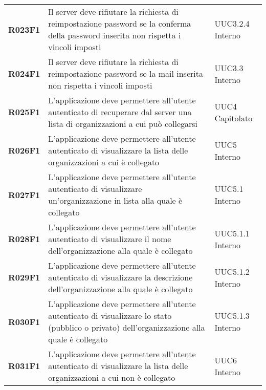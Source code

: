 \documentclass[../analisi-dei-requisiti.tex]{subfiles}
\begin{document}
\begin{longtable}[H]{>{\centering\bfseries}m{3cm} >{\centering}m{10cm} >{\centering\arraybackslash}m{3cm}}
  R023F1                               & Il server deve rifiutare la richiesta di reimpostazione password se la conferma della password inserita non rispetta i vincoli imposti                                                                  & UUC3.2.4 Interno              \\
  R024F1                               & Il server deve rifiutare la richiesta di reimpostazione password se la mail inserita non rispetta i vincoli imposti                                                                                     & UUC3.3 Interno                \\

  R025F1                               & L'applicazione deve permettere all'utente autenticato di recuperare dal server una lista di organizzazioni a cui può collegarsi                                                                         & UUC4 Capitolato               \\
  R026F1                               & L'applicazione deve permettere all'utente autenticato di visualizzare la lista delle organizzazioni a cui è collegato                                                                                   & UUC5 Interno                  \\
  R027F1                               & L'applicazione deve permettere all'utente autenticato di visualizzare un'organizzazione in lista alla quale è collegato                                                                                 & UUC5.1 Interno                \\
  R028F1                               & L'applicazione deve permettere all'utente autenticato di visualizzare il nome dell'organizzazione alla quale è collegato                                                                                & UUC5.1.1 Interno              \\
  R029F1                               & L'applicazione deve permettere all'utente autenticato di visualizzare la descrizione dell'organizzazione alla quale è collegato                                                                         & UUC5.1.2 Interno              \\
  R030F1                               & L'applicazione deve permettere all'utente autenticato di visualizzare lo stato (pubblico o privato) dell'organizzazione alla quale è collegato                                                          & UUC5.1.3 Interno              \\
  R031F1                               & L'applicazione deve permettere all'utente autenticato di visualizzare la lista delle organizzazioni a cui non è collegato                                                                               & UUC6 Interno                  \\

\end{longtable}
\end{document}
